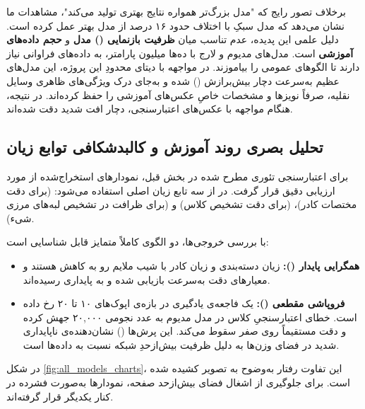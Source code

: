 \begin{tipbox}
برخلاف تصور رایج که "مدل بزرگ‌تر همواره نتایج بهتری تولید می‌کند"، مشاهدات ما نشان می‌دهد که مدل سبکِ  با اختلاف حدود ۱۶ درصد از مدل  بهتر عمل کرده است. 
دلیل علمی این پدیده، عدم تناسب میان \textbf{ظرفیت بازنمایی () مدل} و \textbf{حجم داده‌های آموزشی} است. مدل‌های مدیوم و لارج با ده‌ها میلیون پارامتر، به داده‌های فراوانی نیاز دارند تا الگوهای عمومی را بیاموزند. در مواجهه با دیتای محدودِ این پروژه، این مدل‌های عظیم به‌سرعت دچار بیش‌برازش () شده و به‌جای درک ویژگی‌های ظاهری وسایل نقلیه، صرفاً نویزها و مشخصات خاصِ عکس‌های آموزشی را حفظ کرده‌اند. در نتیجه، هنگام مواجهه با عکس‌های اعتبارسنجی، دچار افت شدید دقت شده‌اند.
\end{tipbox}

\vspace{0.4cm}
\subsection{تحلیل بصری روند آموزش و کالبدشکافی توابع زیان}
برای اعتبارسنجی تئوری مطرح شده در بخش قبل، نمودارهای استخراج‌شده از  مورد ارزیابی دقیق قرار گرفت. در  از سه تابع زیان اصلی استفاده می‌شود:  (برای دقت مختصات کادر)،  (برای دقت تشخیص کلاس) و  (برای ظرافت در تشخیص لبه‌های مرزی شیء).

\begin{notebox}
با بررسی خروجی‌ها، دو الگوی کاملاً متمایز قابل شناسایی است:
\begin{itemize}
    \item \textbf{همگرایی پایدار ():} زیان دسته‌بندی و زیان کادر با شیب ملایم رو به کاهش هستند و معیارهای دقت به‌سرعت بازیابی شده و به پایداری رسیده‌اند.
    \item \textbf{فروپاشی مقطعی ():} یک فاجعه‌ی یادگیری در بازه‌ی اپوک‌های ۱۰ تا ۲۰ رخ داده است. خطای اعتبارسنجیِ کلاس در مدل مدیوم به عدد نجومی ۲۰,۰۰۰ جهش کرده و دقت مستقیماً روی صفر سقوط می‌کند. این پرش‌ها () نشان‌دهنده‌ی ناپایداری شدید در فضای وزن‌ها به دلیل ظرفیت بیش‌ازحدِ شبکه نسبت به داده‌ها است.
\end{itemize}
\end{notebox}

در شکل \ref{fig:all_models_charts}، این تفاوت رفتار به‌وضوح به تصویر کشیده شده است. برای جلوگیری از اشغال فضای بیش‌ازحد صفحه، نمودارها به‌صورت فشرده در کنار یکدیگر قرار گرفته‌اند.

